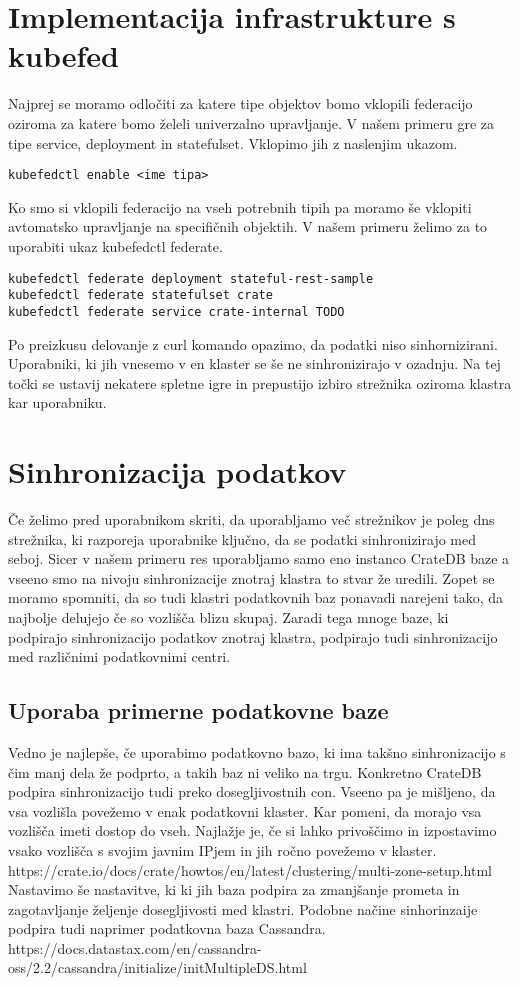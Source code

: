 \documentclass[a4paper, 12pt]{book}
\begin{document}
\section{Implementacija infrastrukture s kubefed}
Najprej se moramo odločiti za katere tipe objektov bomo vklopili federacijo oziroma za katere bomo želeli univerzalno upravljanje. V našem primeru gre za tipe service, deployment in statefulset. Vklopimo jih z naslenjim ukazom.
\begin{verbatim}
kubefedctl enable <ime tipa>
\end{verbatim}
Ko smo si vklopili federacijo na vseh potrebnih tipih pa moramo še vklopiti avtomatsko upravljanje na specifičnih objektih. V našem primeru želimo za to uporabiti ukaz kubefedctl federate.
\begin{verbatim}
kubefedctl federate deployment stateful-rest-sample
kubefedctl federate statefulset crate
kubefedctl federate service crate-internal TODO
\end{verbatim}
Po preizkusu delovanje z curl komando opazimo, da podatki niso sinhornizirani. Uporabniki, ki jih vnesemo v en klaster se še ne sinhronizirajo v ozadnju.
Na tej točki se ustavij nekatere spletne igre in prepustijo izbiro strežnika oziroma klastra kar uporabniku.
\section{Sinhronizacija podatkov}
Če želimo pred uporabnikom skriti, da uporabljamo več strežnikov je poleg dns strežnika, ki razporeja uporabnike ključno, da se podatki sinhronizirajo med seboj.
Sicer v našem primeru res uporabljamo samo eno instanco CrateDB baze a vseeno smo na nivoju sinhronizacije znotraj klastra to stvar že uredili. 
Zopet se moramo spomniti, da so tudi klastri podatkovnih baz ponavadi narejeni tako, da najbolje delujejo če so vozlišča blizu skupaj.
Zaradi tega mnoge baze, ki podpirajo sinhronizacijo podatkov znotraj klastra, podpirajo tudi sinhronizacijo med različnimi podatkovnimi centri.
\subsection{Uporaba primerne podatkovne baze}
Vedno je najlepše, če uporabimo podatkovno bazo, ki ima takšno sinhronizacijo s čim manj dela že podprto, a takih baz ni veliko na trgu.
Konkretno CrateDB podpira sinhronizacijo tudi preko dosegljivostnih con.
Vseeno pa je mišljeno, da vsa vozlišla povežemo v enak podatkovni klaster.
Kar pomeni, da morajo vsa vozlišča imeti dostop do vseh.
Najlažje je, če si lahko privoščimo in izpostavimo vsako vozlišča s svojim javnim IPjem in jih ročno povežemo v klaster.
https://crate.io/docs/crate/howtos/en/latest/clustering/multi-zone-setup.html
Nastavimo še nastavitve, ki ki jih baza podpira za zmanjšanje prometa in zagotavljanje željenje dosegljivosti med klastri.
Podobne načine sinhorinzaije podpira tudi naprimer podatkovna baza Cassandra.
https://docs.datastax.com/en/cassandra-oss/2.2/cassandra/initialize/initMultipleDS.html
\end{document}
